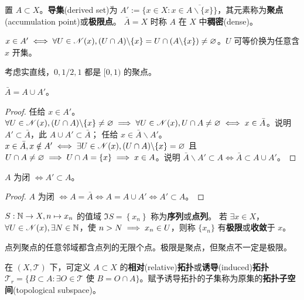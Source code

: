 \begin{definition}
置 $A\subset X$。\textbf{导集}(derived set)为 $A':=\{x \in X:x\in\overline{A\backslash\{x\}}\}$，其元素称为\textbf{聚点}(accumulation point)或\textbf{极限点}。
$\bar{A}=X$ 时称 $A$ 在 $X$ 中\textbf{稠密}(dense)。
\end{definition}
\begin{remark}
    $x\in A'\iff \forall U\in\mathscr N(x),(U\cap A)\backslash\{x\}=U\cap (A\backslash\{x\})\ne\varnothing$。$U$ 可等价换为任意含 $x$ 开集。
\end{remark}
\begin{eg}
    考虑实直线，$0,1/2,1$ 都是 $[0,1)$ 的聚点。
\end{eg}

\begin{theorem}
    $\bar A=A\cup A'$。  
\end{theorem}

\begin{proof}
    任给 $x\in A'$。$\forall U\in\mathscr N(x),(U\cap A)\backslash\{x\}\ne\varnothing\implies \forall U\in\mathscr N(x),U\cap A\ne\varnothing\iff x\in\bar A$。说明 $A'\subset \bar A$，此 $A\cup A'\subset\bar A$；
    任给 $x\in\bar A\backslash A'$。$x\in\bar A,x\notin A'\iff \exists U\in\mathscr N(x),(U\cap A)\backslash\{x\}=\varnothing$ 且 $U\cap A\ne\varnothing\implies U\cap A=\{x\}\implies x\in A$。说明 $\bar A\backslash A'\subset A\iff \bar A\subset A\cup A'$。
\end{proof}

\begin{theorem}
    $A$ 为闭 $\iff A'\subset A$。
\end{theorem}
\begin{proof}
    $A$ 为闭 $\iff A=\bar A\iff A=A\cup A'\iff A'\subset A$。
\end{proof}

\begin{definition}
    $S:\mathbb{N}\to X,n\mapsto x_n$ 的值域 $\Im S=\left\{x_n\right\}$ 称为\textbf{序列}或\textbf{点列}。
    若 $\exists x \in X$，$\forall U\in\mathscr N(x),\exists N\in\mathbb{N}$，使 $n>N\implies x_n\in U$，则称 $\{x_n\}$ 有\textbf{极限}或\textbf{收敛}于 $x$。
\end{definition}

\begin{remark}
    点列聚点的任意邻域都含点列的无限个点。极限是聚点，但聚点不一定是极限。
\end{remark}

\begin{definition}
    在 $(X,\mathscr T)$ 下，可定义 $A \subset X$ 的\textbf{相对}(relative)\textbf{拓扑}或\textbf{诱导}(induced)\textbf{拓扑} $\mathscr T_r=\{B\subset A:\exists O\in\mathscr T$ 使 $B=O \cap A\}$。赋予诱导拓扑的子集称为原集的\textbf{拓扑子空间}(topological subspace)。
\end{definition}

